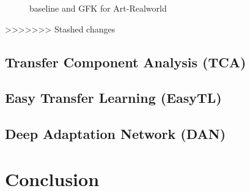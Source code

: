 \documentclass[conference]{IEEEtran}
\begin{document}
\begin{center}
	\begin{figure}[H]
		\centering
		\quad
		\caption{baseline and GFK for Art-Realworld}
		\label{fig:GFK}
	\end{figure}
\end{center}
>>>>>>> Stashed changes

\subsection{Transfer Component Analysis (TCA)}



\subsection{Easy Transfer Learning (EasyTL)}


\subsection{Deep Adaptation Network (DAN)}

\section{Conclusion}

\cite{lowe1999object}

\end{document}
